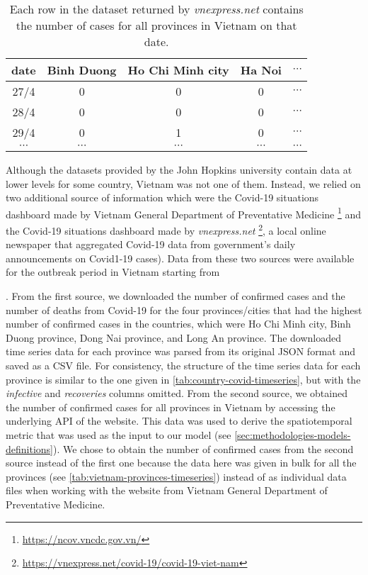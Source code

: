 \begin{table}[h]
\centering
\begin{tabular}{|c | c | c | c | c }
    date & Binh Duong & Ho Chi Minh city & Ha Noi & $\cdots$ \\
    \hline\hline
    27/4 & 0 & 0 & 0 & $\cdots$ \\
    \hline
    28/4 & 0 & 0 & 0 & $\cdots$ \\
    \hline
    29/4 & 0 & 1 & 0 & $\cdots$ \\
    \hline
    $\cdots$ & $\cdots$ & $\cdots$ & $\cdots$ & $\cdots$ \\
\end{tabular}
\caption{Each row in the dataset returned by \textit{vnexpress.net} contains the number of cases for all provinces in Vietnam on that date.}
\label{tab:vietnam-provinces-timeseries}
\end{table}

Although the datasets provided by the John Hopkins university contain data at lower levels for some country, Vietnam was not one of them.
Instead, we relied on two additional source of information which were the Covid-19 situations dashboard made by Vietnam General Department of Preventative Medicine \footnote{\url{https://ncov.vncdc.gov.vn/}} and the Covid-19 situations dashboard made by \textit{vnexpress.net} \footnote{\url{https://vnexpress.net/covid-19/covid-19-viet-nam}}, a local online newspaper that aggregated Covid-19 data from government's daily announcements on Covid1-19 cases).
Data from these two sources were available for the outbreak period in Vietnam starting from \date{27th April 2021}.
From the first source, we downloaded the number of confirmed cases and the number of deaths from Covid-19 for the four provinces/cities that had the highest number of confirmed cases in the countries, which were Ho Chi Minh city, Binh Duong province, Dong Nai province, and Long An province.
The downloaded time series data for each province was parsed from its original \gls{JSON} format and saved as a \gls{CSV} file.
For consistency, the structure of the time series data for each province is similar to the one given in \autoref{tab:country-covid-timeseries}, but with the \textit{infective} and \textit{recoveries} columns omitted.
From the second source, we obtained the number of confirmed cases for all provinces in Vietnam by accessing the underlying \gls{API} of the website.
This data was used to derive the spatiotemporal metric that was used as the input to our model (see \autoref{sec:methodologies-models-definitions}).
We chose to obtain the number of confirmed cases from the second source instead of the first one because the data here was given in bulk for all the provinces (see \autoref{tab:vietnam-provinces-timeseries}) instead of as individual data files when working with the website from Vietnam General Department of Preventative Medicine.

